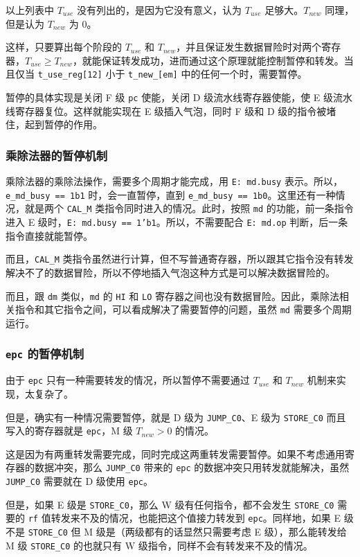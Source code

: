 \documentclass[12pt,AutoFakeBold,AutoFakeSlant]{article}
\newcommand{\ms}[1]{\texttt{#1}}
\begin{document}
以上列表中 $ T_{use} $ 没有列出的，是因为它没有意义，认为 $ T_{use} $ 足够大。$ T_{new} $ 同理，但是认为 $ T_{new} $ 为 0。

这样，只要算出每个阶段的 $ T_{use} $ 和 $ T_{new} $，并且保证发生数据冒险时对两个寄存器，$ T_{use} \ge T_{new} $，就能保证转发成功，进而通过这个原理就能控制暂停和转发。当且仅当 \texttt{t\_use\_reg{[}12{]}} 小于 \texttt{t\_new\_{[}em{]}} 中的任何一个时，需要暂停。

暂停的具体实现是关闭 F 级 \ms{pc} 使能，关闭 D 级流水线寄存器使能，使 E 级流水线寄存器复位。这样就能实现在 E 级插入气泡，同时 F 级和 D 级的指令被堵住，起到暂停的作用。

\subsubsection{乘除法器的暂停机制}

乘除法器的乘除法操作，需要多个周期才能完成，用 \ms{E: md.busy} 表示。所以，\texttt{e\_md\_busy\ ==\ 1\textquotesingle{}b1} 时，会一直暂停，直到
\texttt{e\_md\_busy\ ==\ 1\textquotesingle{}b0}。这里还有一种情况，就是两个 \ms{CAL\_M} 类指令同时进入的情况。此时，按照 \ms{md} 的功能，前一条指令进入 E 级时，\ms{E: md.busy == 1'b1}。所以，不需要配合 \ms{E: md.op} 判断，后一条指令直接就能暂停。

而且，\texttt{CAL\_M} 类指令虽然进行计算，但不写普通寄存器，所以跟其它指令没有转发解决不了的数据冒险，所以不停地插入气泡这种方式是可以解决数据冒险的。

而且，跟 \texttt{dm} 类似，\texttt{md} 的 \texttt{HI} 和 \texttt{LO} 寄存器之间也没有数据冒险。因此，乘除法相关指令和其它指令之间，可以看成解决了需要暂停的问题，虽然 \texttt{md} 需要多个周期运行。

\subsubsection{\ms{epc} 的暂停机制}

由于 \texttt{epc} 只有一种需要转发的情况，所以暂停不需要通过 $ T_{use} $ 和 $ T_{new} $ 机制来实现，太复杂了。

但是，确实有一种情况需要暂停，就是 D 级为
\texttt{JUMP\_C0}、E 级为 \texttt{STORE\_C0} 而且写入的寄存器就是
\texttt{epc}，M 级 $ T_{new} > 0 $ 的情况。

这是因为有两重转发需要完成，同时完成这两重转发需要暂停。如果不考虑通用寄存器的数据冲突，那么 \ms{JUMP\_C0} 带来的 \ms{epc} 的数据冲突只用转发就能解决，虽然 \ms{JUMP\_C0} 需要就在 D 级使用 \ms{epc}。

但是，如果 E 级是 \ms{STORE\_C0}，那么 W 级有任何指令，都不会发生 \ms{STORE\_C0} 需要的 \ms{rf} 值转发来不及的情况，也能把这个值接力转发到 \ms{epc}。同样地，如果 E 级不是 \ms{STORE\_C0} 但 M 级是（两级都有的话显然只需要考虑 E 级），那么能转发给 M 级 \ms{STORE\_C0} 的也就只有 W 级指令，同样不会有转发来不及的情况。
\end{document}
